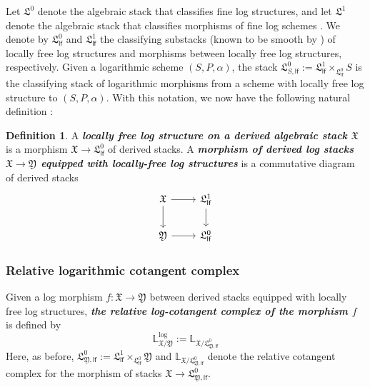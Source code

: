 \documentclass[11pt]{amsart}
\theoremstyle{plain}
\numberwithin{equation}{section}
\theoremstyle{definition}
\newtheorem{Def}{Definition}[section]
\theoremstyle{plain}
\begin{document}

Let $\mathfrak L^0$ denote the algebraic stack that classifies fine log structures, and let $\mathfrak L^1$ denote the algebraic stack that classifies morphisms of fine log schemes  \cite{27}. We denote by $\mathfrak{L}^0_{\mathsf{lf}}$ and $\mathfrak L^1_\mathsf{lf}$ the classifying substacks  (known to be smooth by \cite[Proposition 1.7]{Pr}) of locally free log structures and morphisms between locally free log structures, respectively. Given a logarithmic scheme $(S, P, \alpha)$, the stack $\mathfrak L^0_{S,\mathsf{lf}}:=\mathfrak L^1_\mathsf{lf}\times_{\mathfrak L^0_{\mathsf{lf}}} S$ is the classifying stack of logarithmic morphisms from a scheme with locally free log structure to $(S, P,\alpha)$. With this notation, we now have the following natural definition \cite{Pr}:

\smallskip

\begin{Def} \label{def:logstrstacks}
A \emph{\bfseries locally free log structure on a derived algebraic stack $\mathfrak X$} is a morphism $\mathfrak X\longrightarrow \mathfrak L^0_{\mathsf{lf}}$ of derived 
stacks. A \emph{\bfseries morphism of derived log stacks $\mathfrak X\longrightarrow \mathfrak Y$ equipped with locally-free log structures} is a commutative diagram of derived stacks
\begin{equation}
\begin{tikzcd}
\mathfrak X\arrow{r}\arrow{d} & \mathfrak L^1_{\mathsf{lf}}\arrow{d}\\
\mathfrak Y\arrow{r} & \mathfrak L^0_{\mathsf{lf}}
\end{tikzcd} 
\end{equation}
\end{Def}

\smallskip

\subsubsection{\textbf{Relative logarithmic cotangent complex}}

Given a log morphism $f: \mathfrak X\longrightarrow \mathfrak Y$ between derived stacks equipped with locally free log structures, \emph{\bfseries the relative log-cotangent complex of the morphism $f$} is defined by 
\begin{equation}
{\mathbb L}^{\log}_{\mathfrak X/ \mathfrak Y}:=\mathbb L_{\mathfrak X/ \mathfrak{L}^0_{\mathfrak{Y},\mathsf{lf} }}
\end{equation}
Here, as before,  $\mathfrak{L}^0_{\mathfrak{Y},\mathsf{lf}} := \mathfrak{L}^{1}_{\mathsf{lf}}\times_{\mathfrak{L}^{0}_{\mathsf{lf}}} \mathfrak{Y}$ and  $\mathbb L_{\mathfrak X/ \mathfrak L^0_{\mathfrak{Y},\mathsf{lf}}}$ denote the relative cotangent complex for the morphism of stacks $\mathfrak X\longrightarrow  \mathfrak L^0_{\mathfrak{Y},\mathsf{lf}}$.
\end{document}
